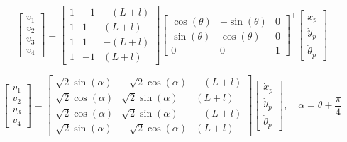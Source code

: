 \begin{equation*}
    \begin{bmatrix}
        v_1 \\
        v_2 \\
        v_3 \\
        v_4
    \end{bmatrix} =
    \begin{bmatrix}
        1 & -1 & -(L+l) \\
        1 & 1 & (L+l) \\
        1 & 1 & -(L+l) \\
        1 & -1 & (L+l)
    \end{bmatrix}
    \begin{bmatrix}
        \cos(\theta) & -\sin(\theta) & 0 \\
        \sin(\theta) & \cos(\theta) & 0 \\
        0 & 0 & 1
    \end{bmatrix}^\top
    \begin{bmatrix}
        \dot{x}_p \\
        \dot{y}_p \\
        \dot{\theta}_p
    \end{bmatrix}
\end{equation*}

\begin{equation*}
    \begin{bmatrix}
        v_1 \\
        v_2 \\
        v_3 \\
        v_4
    \end{bmatrix} =
    \begin{bmatrix}
        \sqrt{2}\sin(\alpha) & -\sqrt{2}\cos(\alpha) & -(L+l) \\
        \sqrt{2}\cos(\alpha) & \sqrt{2}\sin(\alpha) & (L+l) \\
        \sqrt{2}\cos(\alpha) & \sqrt{2}\sin(\alpha) & -(L+l) \\
        \sqrt{2}\sin(\alpha) & -\sqrt{2}\cos(\alpha) & (L+l)
    \end{bmatrix}
    \begin{bmatrix}
        \dot{x}_p \\
        \dot{y}_p \\
        \dot{\theta}_p
    \end{bmatrix}, \quad
    \alpha = \theta + \frac{\pi}{4}
\end{equation*}

